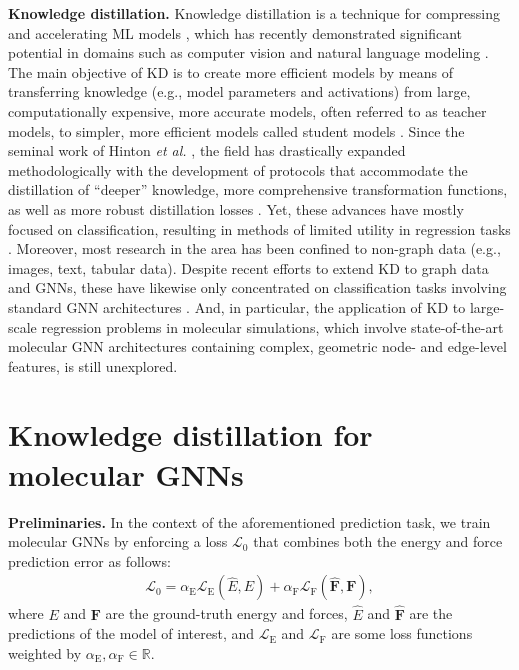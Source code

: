 \documentclass{article}
\newcommand{\loss}{\mathcal{L}}
\newcommand{\R}{\mathbb{R}} %
\begin{document}
\textbf{Knowledge distillation.}
Knowledge distillation is a technique for compressing and accelerating ML models \cite{cheng2018model}, which has recently demonstrated significant potential in domains such as computer vision \cite{wang2021knowledge} and natural language modeling \cite{sanh2019distilbert}. The main objective of KD is to create more efficient models by means of transferring knowledge (e.g., model parameters and activations) from large, computationally expensive, more accurate models, often referred to as teacher models, to simpler, more efficient models called student models \cite{gou2021knowledge}. Since the seminal work of Hinton \textit{et al.} \cite{hinton_distilling_2015}, the field has drastically expanded methodologically with the development of protocols that accommodate the distillation of ``deeper'' knowledge, more comprehensive transformation functions, as well as more robust distillation losses \cite{gou2021knowledge, hu2022teacher}. Yet, these advances have mostly focused on classification, resulting in methods of limited utility in regression tasks \cite{xu2022contrastive}. Moreover, most research in the area has been confined to non-graph data (e.g., images, text, tabular data). Despite recent efforts to extend KD to graph data and GNNs, these have likewise only concentrated on classification tasks involving standard GNN architectures \cite{tian2023knowledge, liu2023graph}. And, in particular, the application of KD to large-scale regression problems in molecular simulations, which involve state-of-the-art molecular GNN architectures containing complex, geometric node- and edge-level features, is still unexplored.

\section{Knowledge distillation for molecular GNNs}
\textbf{Preliminaries.}
In the context of the aforementioned prediction task, we train molecular GNNs by enforcing a loss $\loss_0$ that combines both the energy and force prediction error as follows: 
\begin{align}
    \loss_0 = \alpha_\text{E} \loss_\text{E}(\hat{E}, E) + \alpha_\text{F} \loss_\text{F}(\hat{\boldsymbol{F}}, \boldsymbol{F}),
\end{align}
where $E$ and $\boldsymbol{F}$ are the ground-truth energy and forces, $\hat{E}$ and $\hat{\boldsymbol{F}}$ are the predictions of the model of interest, and $\loss_\text{E}$ and $\loss_\text{F}$ are some loss functions weighted by $\alpha_\text{E}, \alpha_\text{F}\in\R$. 
\end{document}
